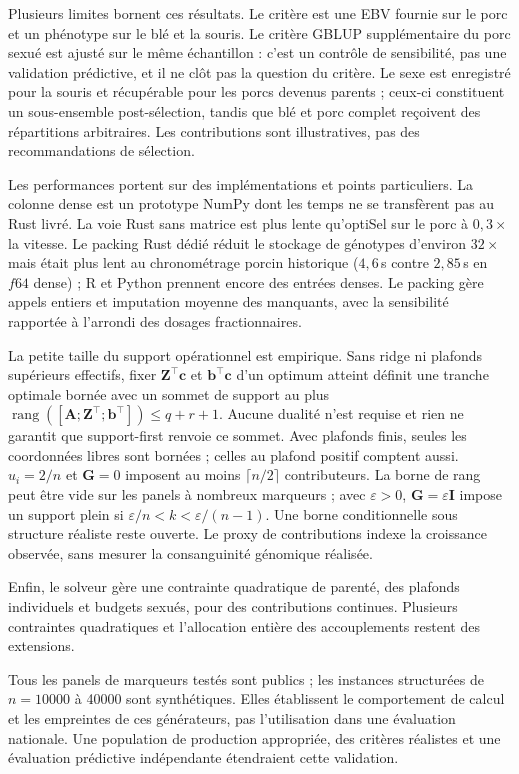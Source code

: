 \documentclass[11pt]{article}
\newcommand{\tp}{^{\top}}
\newcommand{\bc}{\mathbf{c}}
\newcommand{\bb}{\mathbf{b}}
\newcommand{\bG}{\mathbf{G}}
\newcommand{\bZ}{\mathbf{Z}}
\newcommand{\bA}{\mathbf{A}}
\begin{document}
Plusieurs limites bornent ces résultats. Le critère est une EBV fournie sur le porc et un phénotype sur le blé et la souris. Le critère GBLUP supplémentaire du porc sexué est ajusté sur le même échantillon : c'est un contrôle de sensibilité, pas une validation prédictive, et il ne clôt pas la question du critère. Le sexe est enregistré pour la souris et récupérable pour les porcs devenus parents ; ceux-ci constituent un sous-ensemble post-sélection, tandis que blé et porc complet reçoivent des répartitions arbitraires. Les contributions sont illustratives, pas des recommandations de sélection.

Les performances portent sur des implémentations et points particuliers. La colonne dense est un prototype NumPy dont les temps ne se transfèrent pas au Rust livré. La voie Rust sans matrice est plus lente qu'optiSel sur le porc à $0{,}3\times$ la vitesse. Le packing Rust dédié réduit le stockage de génotypes d'environ $32\times$ mais était plus lent au chronométrage porcin historique ($4{,}6$\,s contre $2{,}85$\,s en $f64$ dense) ; R et Python prennent encore des entrées denses. Le packing gère appels entiers et imputation moyenne des manquants, avec la sensibilité rapportée à l'arrondi des dosages fractionnaires.

La petite taille du support opérationnel est empirique. Sans ridge ni plafonds supérieurs effectifs, fixer $\bZ\tp\bc$ et $\bb\tp\bc$ d'un optimum atteint définit une tranche optimale bornée avec un sommet de support au plus $\operatorname{rang}([\bA;\bZ\tp;\bb\tp])\le q+r+1$. Aucune dualité n'est requise et rien ne garantit que support-first renvoie ce sommet. Avec plafonds finis, seules les coordonnées libres sont bornées ; celles au plafond positif comptent aussi. $u_i=2/n$ et $\bG=0$ imposent au moins $\lceil n/2\rceil$ contributeurs. La borne de rang peut être vide sur les panels à nombreux marqueurs ; avec $\varepsilon>0$, $\bG=\varepsilon\mathbf{I}$ impose un support plein si $\varepsilon/n<k<\varepsilon/(n-1)$. Une borne conditionnelle sous structure réaliste reste ouverte. Le proxy de contributions indexe la croissance observée, sans mesurer la consanguinité génomique réalisée.

Enfin, le solveur gère une contrainte quadratique de parenté, des plafonds individuels et budgets sexués, pour des contributions continues. Plusieurs contraintes quadratiques et l'allocation entière des accouplements restent des extensions.

Tous les panels de marqueurs testés sont publics ; les instances structurées de $n=10000$ à 40000 sont synthétiques. Elles établissent le comportement de calcul et les empreintes de ces générateurs, pas l'utilisation dans une évaluation nationale. Une population de production appropriée, des critères réalistes et une évaluation prédictive indépendante étendraient cette validation.
\end{document}
